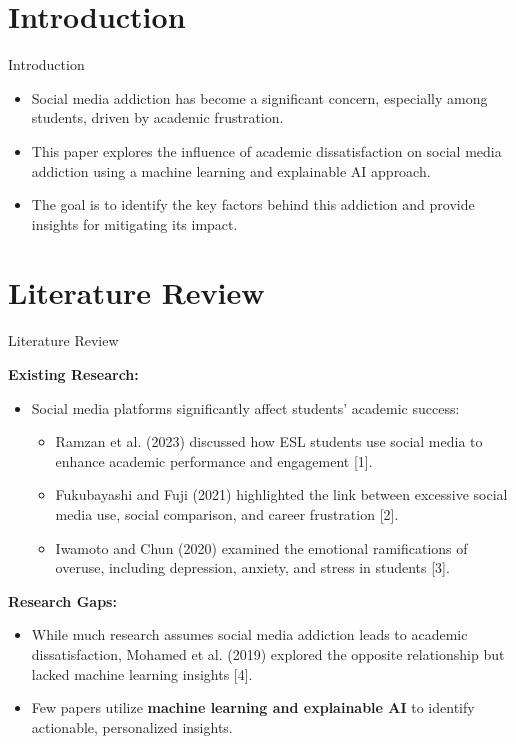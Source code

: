 \documentclass{beamer}
\begin{document}
\section{Introduction}
\begin{frame}{Introduction}
    \begin{itemize}
        \item Social media addiction has become a significant concern, especially among students, driven by academic frustration.
        \item This paper explores the influence of academic dissatisfaction on social media addiction using a machine learning and explainable AI approach.
        \item The goal is to identify the key factors behind this addiction and provide insights for mitigating its impact.
    \end{itemize}
    \vfill %
\end{frame}

\section{Literature Review}
\begin{frame}{Literature Review}

\textbf{Existing Research:}
\begin{itemize}
    \item Social media platforms significantly affect students' academic success:
    \begin{itemize}
        \item Ramzan et al. (2023) discussed how ESL students use social media to enhance academic performance and engagement [1].
        \item Fukubayashi and Fuji (2021) highlighted the link between excessive social media use, social comparison, and career frustration [2].
        \item Iwamoto and Chun (2020) examined the emotional ramifications of overuse, including depression, anxiety, and stress in students [3].
    \end{itemize}
\end{itemize}

\textbf{Research Gaps:}
\begin{itemize}
    \item While much research assumes social media addiction leads to academic dissatisfaction, Mohamed et al. (2019) explored the opposite relationship but lacked machine learning insights [4].
    \item Few papers utilize \textbf{machine learning and explainable AI} to identify actionable, personalized insights.
\end{itemize}

\end{frame}
\end{document}

